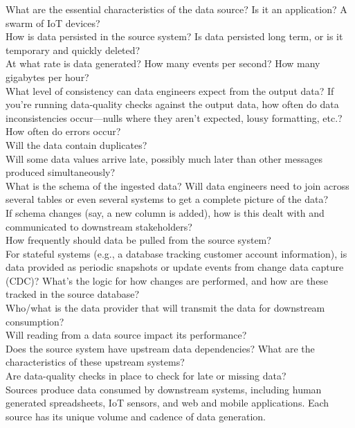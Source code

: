 \documentclass[12pt]{book}
\begin{document}
What are the essential characteristics of the data source? Is it an application? A swarm of IoT devices?\\
How is data persisted in the source system? Is data persisted long term, or is it temporary and quickly deleted?\\
At what rate is data generated? How many events per second? How many gigabytes per hour?\\
What level of consistency can data engineers expect from the output data? If you’re running data-quality checks against the output data, how often do data inconsistencies occur—nulls where they aren’t expected, lousy formatting, etc.?\\
How often do errors occur?\\
Will the data contain duplicates?\\
Will some data values arrive late, possibly much later than other messages produced simultaneously?\\
What is the schema of the ingested data? Will data engineers need to join across several tables or even several systems to get a complete picture of the data?\\
If schema changes (say, a new column is added), how is this dealt with and communicated to downstream stakeholders?\\
How frequently should data be pulled from the source system?\\
For stateful systems (e.g., a database tracking customer account information), is data provided as periodic snapshots or update events from change data capture (CDC)? What’s the logic for how changes are performed, and how are these tracked in the source database?\\
Who/what is the data provider that will transmit the data for downstream consumption?\\
Will reading from a data source impact its performance?\\
Does the source system have upstream data dependencies? What are the characteristics of these upstream systems?\\
Are data-quality checks in place to check for late or missing data?\\

Sources produce data consumed by downstream systems, including human generated spreadsheets, IoT sensors, and web and mobile applications. Each source has its unique volume and cadence of data generation.
\end{document}
